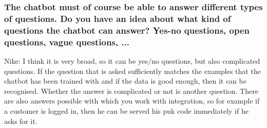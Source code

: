 \begin{appendices}
	\subsubsection{The chatbot must of course be able to answer different types of questions.
		Do you have an idea about what kind of questions the chatbot can answer?
		Yes-no questions, open questions, vague questions, ...}
	Nike: I think it is very broad, so it can be yes/no questions, but also complicated questions. If the question that is asked sufficiently matches the examples that the chatbot has been trained with and if the data is good enough, then it can be recognised. Whether the answer is complicated or not is another question. There are also answers possible with which you work with integration, so for example if a customer is logged in, then he can be served his puk code immediately if he asks for it.\\
	\break

\end{appendices}
